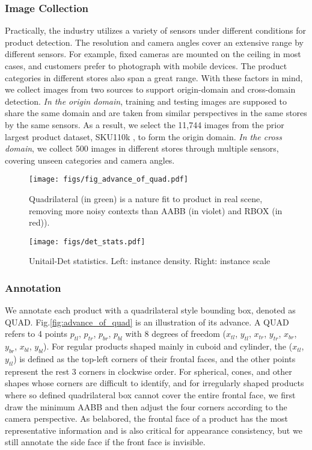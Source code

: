 \documentclass[runningheads]{llncs}
\begin{document}
\subsubsection{Image Collection} 
Practically, the industry utilizes a variety of sensors under different conditions for product detection. The resolution and camera angles cover an extensive range by different sensors.
For example, fixed cameras are mounted on the ceiling in most cases, and customers prefer to photograph with mobile devices. The product categories in different stores also span a great range.
With these factors in mind, we collect images from two sources to support origin-domain and cross-domain detection. 
\textit{In the origin domain}, training and testing images are supposed to share the same domain and are taken from similar perspectives in the same stores by the same sensors. As a result, we select the 11,744 images from the prior largest product dataset, SKU110k \cite{SKU110k}, to form the origin domain. 
\textit{In the cross domain}, we collect 500 images in different stores through multiple sensors, covering unseen categories and camera angles.

\begin{figure}[t]
    \begin{minipage}{.48\columnwidth}
    \centering
    \texttt{[image: figs/fig\_advance\_of\_quad.pdf]}
    \caption{Quadrilateral (in green) is a nature fit to product in real scene, removing more noisy contexts than AABB (in violet) and RBOX (in red)).}
    \label{fig:advance_of_quad}
    \end{minipage}\hfill
    \begin{minipage}{.47\columnwidth}
    \centering
    \texttt{[image: figs/det\_stats.pdf]}
    \caption{Unitail-Det statistics. Left: instance density. Right: instance scale}
    \label{fig:det_stats}
    \end{minipage}
\end{figure}


\subsubsection{Annotation} We annotate each product with a quadrilateral style bounding box, denoted as QUAD. Fig.\ref{fig:advance_of_quad} is an illustration of its advance. A QUAD refers to 4 points $p_{tl}$, $p_{tr}$, $p_{br}$, $p_{bl}$ with 8 degrees of freedom ($x_{tl}$, $y_{tl}$, $x_{tr}$, $y_{tr}$, $x_{br}$, $y_{br}$, $x_{bl}$, $y_{bl}$). For regular products shaped mainly in cuboid and cylinder, the ($x_{tl}$,$y_{tl}$) is defined as the top-left corners of their frontal faces, and the other points represent the rest 3 corners in clockwise order. For spherical, cones, and other shapes whose corners are difficult to identify, and for irregularly shaped products where so defined quadrilateral box cannot cover the entire frontal face, we first draw the minimum AABB and then adjust the four corners according to the camera perspective. 
As belabored, the frontal face of a product has the most representative information and is also critical for appearance consistency, but we still annotate the side face if the front face is invisible. 
\end{document}

